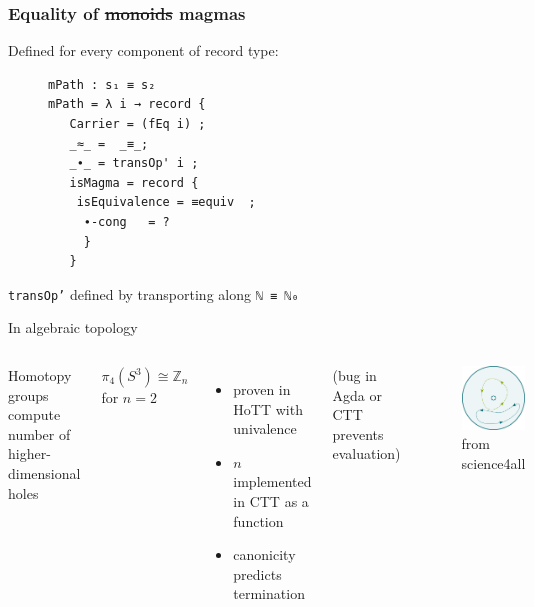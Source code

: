 \documentclass[english]{beamer}
\begin{document}
\begin{frame}[fragile]
\frametitle{Equality of \st{monoids} magmas}

Defined for every component of record type:

\begin{figure}
\begin{BVerbatim}
mPath : s₁ ≡ s₂
mPath = λ i → record {
   Carrier = (fEq i) ;
   _≈_ =  _≡_;
   _∙_ = transOp' i ;
   isMagma = record {
    isEquivalence = ≡equiv  ;
     ∙-cong   = ?
     }
   }
\end{BVerbatim}
\end{figure}

\texttt{transOp'} defined by transporting along \texttt{ℕ ≡ ℕ₀}

\end{frame}

\begin{frame}{In algebraic topology}

 \begin{columns}%
        Homotopy groups compute number of higher-dimensional holes
        \begin{theorem}
            $\pi _ 4 (S^3) \cong \mathbb{Z}_n$ for $n=2$ 

            \end{theorem}
            \begin{itemize}
            \item proven in HoTT with univalence
            \item $n$ implemented in CTT as a function
            \item canonicity predicts termination
            \end{itemize}
        (bug in Agda or CTT prevents evaluation)

            \begin{figure}
                \includegraphics[height=0.4\textheight]{figures/loops}
                \caption{from science4all}
            \end{figure}
    \end{columns}

\end{frame}
\end{document}
